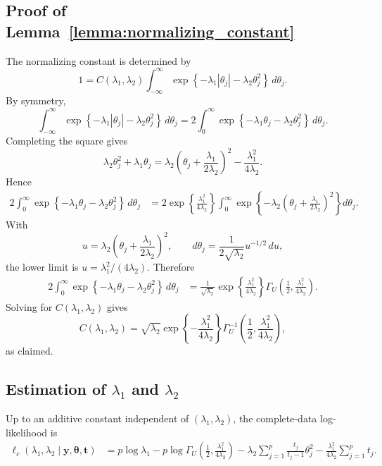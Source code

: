 \documentclass[preprint,12pt,authoryear]{elsarticle}
\def\bs{\boldsymbol}
\def\th{\boldsymbol{\theta}}
\begin{document}
\subsection{Proof of Lemma~\ref{lemma:normalizing_constant}}


The normalizing constant is determined by
\[
1
=
C(\lambda_1,\lambda_2)
\int_{-\infty}^{\infty}
\exp\left\{-\lambda_1|\theta_j|-\lambda_2\theta_j^2\right\}\,d\theta_j .
\]
By symmetry,
\[
\int_{-\infty}^{\infty}
\exp\left\{-\lambda_1|\theta_j|-\lambda_2\theta_j^2\right\}\,d\theta_j
=
2\int_0^\infty
\exp\left\{-\lambda_1\theta_j-\lambda_2\theta_j^2\right\}\,d\theta_j .
\]
Completing the square gives
\[
\lambda_2\theta_j^2
+
\lambda_1\theta_j
=
\lambda_2\left(\theta_j+\frac{\lambda_1}{2\lambda_2}\right)^2
-
\frac{\lambda_1^2}{4\lambda_2}.
\]
Hence
\[
\begin{aligned}
2\int_0^\infty
\exp\left\{-\lambda_1\theta_j-\lambda_2\theta_j^2\right\}\,d\theta_j
&=
2\exp\left\{\frac{\lambda_1^2}{4\lambda_2}\right\}
\int_0^\infty
\exp\left\{-\lambda_2\left(\theta_j+\frac{\lambda_1}{2\lambda_2}\right)^2\right\}d\theta_j .
\end{aligned}
\]
With
\[
u=\lambda_2\left(\theta_j+\frac{\lambda_1}{2\lambda_2}\right)^2,
\qquad
d\theta_j=\frac{1}{2\sqrt{\lambda_2}}u^{-1/2}\,du,
\]
the lower limit is \(u=\lambda_1^2/(4\lambda_2)\). Therefore
\[
\begin{aligned}
2\int_0^\infty
\exp\left\{-\lambda_1\theta_j-\lambda_2\theta_j^2\right\}\,d\theta_j
&=
\frac{1}{\sqrt{\lambda_2}}
\exp\left\{\frac{\lambda_1^2}{4\lambda_2}\right\}
\Gamma_U\left(\frac12,\frac{\lambda_1^2}{4\lambda_2}\right).
\end{aligned}
\]
Solving for \(C(\lambda_1,\lambda_2)\) gives
\[
C(\lambda_1,\lambda_2)
=
\sqrt{\lambda_2}
\exp\left\{-\frac{\lambda_1^2}{4\lambda_2}\right\}
\Gamma_U^{-1}\left(\frac12,\frac{\lambda_1^2}{4\lambda_2}\right),
\]
as claimed.


\subsection{Estimation of \texorpdfstring{$\lambda_1$ and $\lambda_2$}{lambda1 and lambda2}}


Up to an additive constant independent of \((\lambda_1,\lambda_2)\), the
complete-data log-likelihood is
\begin{align}
\ell_c(\lambda_1,\lambda_2 \mid \bs y,\th,\bs t)
&=
p\log \lambda_1
-p\log \Gamma_U\!\left(\frac12,\frac{\lambda_1^2}{4\lambda_2}\right)
-\lambda_2\sum_{j=1}^p \frac{t_j}{t_j-1}\theta_j^2
-\frac{\lambda_1^2}{4\lambda_2}\sum_{j=1}^p t_j .
\label{eq:complete_loglik_lambda_clean}
\end{align}
\end{document}
